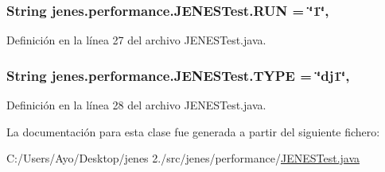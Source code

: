 \hypertarget{classjenes_1_1performance_1_1_j_e_n_e_s_test_a5c84bd75d825c995f6bebb79b45df6c1}{
\subsubsection[{R\-U\-N}]{\setlength{\rightskip}{0pt plus 5cm}String jenes.\-performance.\-J\-E\-N\-E\-S\-Test.\-R\-U\-N = \char`\"{}1\char`\"{}\hspace{0.3cm}{\ttfamily [static]}, {\ttfamily [protected]}}}\label{classjenes_1_1performance_1_1_j_e_n_e_s_test_a5c84bd75d825c995f6bebb79b45df6c1}


Definición en la línea 27 del archivo J\-E\-N\-E\-S\-Test.\-java.

\hypertarget{classjenes_1_1performance_1_1_j_e_n_e_s_test_a6b35bbf22096ec3923e78d2bc407c2f4}{
\subsubsection[{T\-Y\-P\-E}]{\setlength{\rightskip}{0pt plus 5cm}String jenes.\-performance.\-J\-E\-N\-E\-S\-Test.\-T\-Y\-P\-E = \char`\"{}dj1\char`\"{}\hspace{0.3cm}{\ttfamily [static]}, {\ttfamily [protected]}}}\label{classjenes_1_1performance_1_1_j_e_n_e_s_test_a6b35bbf22096ec3923e78d2bc407c2f4}


Definición en la línea 28 del archivo J\-E\-N\-E\-S\-Test.\-java.



La documentación para esta clase fue generada a partir del siguiente fichero\-:\begin{DoxyCompactItemize}
\item 
C\-:/\-Users/\-Ayo/\-Desktop/jenes 2./src/jenes/performance/\hyperlink{_j_e_n_e_s_test_8java}{J\-E\-N\-E\-S\-Test.\-java}\end{DoxyCompactItemize}
